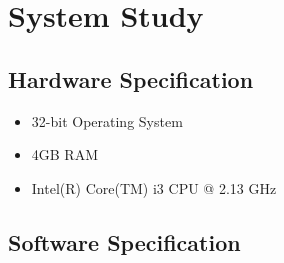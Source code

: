 \documentclass[amsart, 12pt]{article}
\begin{document}
\section{System Study}
\subsection{Hardware Specification}
\begin{itemize}
    \item 32-bit Operating System 
\item 4GB RAM 
\item Intel(R) Core(TM) i3 CPU @ 2.13 GHz
\end{itemize}

\subsection{Software Specification}
\end{document}
